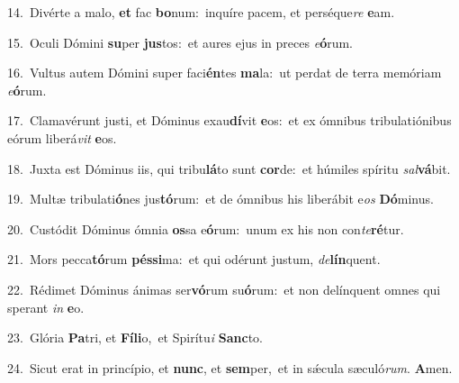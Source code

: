 {\numbfont\textcolor{\numbcolor}{14.}}~Divérte a malo, \textbf{et} fac \textbf{bo}\-num:~\star inquíre pacem, et perséque\textit{re} \textbf{e}\-am.\par
{\numbfont\textcolor{\numbcolor}{15.}}~Oculi Dómini \textbf{su}\-per \textbf{jus}\-tos:~\star et aures ejus in preces \textit{e}\-\textbf{ó}rum.\par
{\numbfont\textcolor{\numbcolor}{16.}}~Vultus autem Dómini super faci\-\textbf{én}\-tes \textbf{ma}\-la:~\star ut perdat de terra memóriam \textit{e}\-\textbf{ó}rum.\par
{\numbfont\textcolor{\numbcolor}{17.}}~Clamavérunt justi, et Dóminus exau\-\textbf{dí}\-vit \textbf{e}\-os:~\star et ex ómnibus tribulatiónibus eórum liberá\textit{vit} \textbf{e}\-os.\par
{\numbfont\textcolor{\numbcolor}{18.}}~Juxta est Dóminus iis, qui tribu\-\textbf{lá}\-to sunt \textbf{cor}\-de:~\star et húmiles spíritu \textit{sal}\-\textbf{vá}bit.\par
{\numbfont\textcolor{\numbcolor}{19.}}~Multæ tribulati\-\textbf{ó}\-nes jus\-\textbf{tó}\-rum:~\star et de ómnibus his liberábit e\textit{os} \textbf{Dó}\-minus.\par
{\numbfont\textcolor{\numbcolor}{20.}}~Custódit Dóminus ómnia \textbf{os}\-sa e\-\textbf{ó}\-rum:~\star unum ex his non con\-\textit{te}\-\textbf{ré}tur.\par
{\numbfont\textcolor{\numbcolor}{21.}}~Mors pecca\-\textbf{tó}\-rum \textbf{pés}\-\textbf{si}ma:~\star et qui odérunt justum, \textit{de}\-\textbf{lín}quent.\par
{\numbfont\textcolor{\numbcolor}{22.}}~Rédimet Dóminus ánimas ser\-\textbf{vó}\-rum su\-\textbf{ó}\-rum:~\star et non delínquent omnes qui sperant \textit{in} \textbf{e}\-o.\par
{\numbfont\textcolor{\numbcolor}{23.}}~Glória \textbf{Pa}\-tri, et \textbf{Fí}\-\textbf{li}o,~\star et Spirítu\textit{i} \textbf{Sanc}\-to.\par
{\numbfont\textcolor{\numbcolor}{24.}}~Sicut erat in princípio, et \textbf{nunc}\-, et \textbf{sem}\-per,~\star et in sǽcula sæculó\-\textit{rum}\-. \textbf{A}\-men.\par
